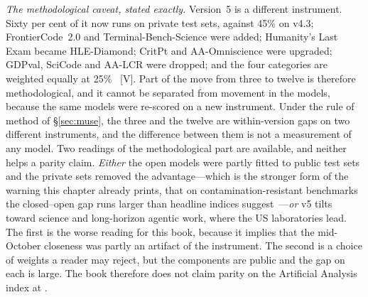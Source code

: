 \emph{The methodological caveat, stated exactly.} Version~5 is a different instrument. Sixty per cent of it now runs on private test sets, against 45\% on v4.3; FrontierCode~2.0 and Terminal-Bench-Science were added; Humanity's Last Exam became HLE-Diamond; CritPt and AA-Omniscience were upgraded; GDPval, SciCode and AA-LCR were dropped; and the four categories are weighted equally at 25\%~\cite{mdl-aa-v5} [V]. Part of the move from three to twelve is therefore methodological, and it cannot be separated from movement in the models, because the same models were re-scored on a new instrument. Under the rule of method of \S\ref{sec:muse}, the three and the twelve are within-version gaps on two different instruments, and the difference between them is not a measurement of any model. Two readings of the methodological part are available, and neither helps a parity claim. \emph{Either} the open models were partly fitted to public test sets and the private sets removed the advantage---which is the stronger form of the warning this chapter already prints, that on contamination-resistant benchmarks the closed--open gap runs larger than headline indices suggest~\cite{deepseek-v4}---\emph{or} v5 tilts toward science and long-horizon agentic work, where the US laboratories lead. The first is the worse reading for this book, because it implies that the mid-October closeness was partly an artifact of the instrument. The second is a choice of weights a reader may reject, but the components are public and the gap on each is large. The book therefore does not claim parity on the Artificial Analysis index at \datafreeze.

